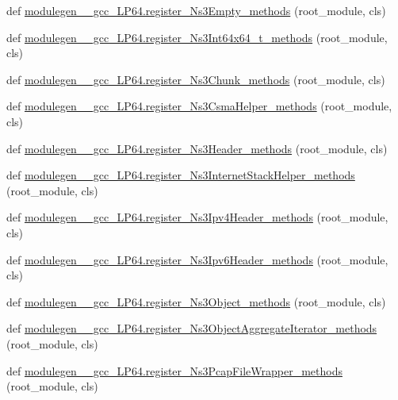 \begin{DoxyCompactItemize}
\item 
def \hyperlink{namespacemodulegen____gcc__LP64_af245edb84966d4b4c48221a31647be89}{modulegen\+\_\+\+\_\+gcc\+\_\+\+L\+P64.\+register\+\_\+\+Ns3\+Empty\+\_\+methods} (root\+\_\+module, cls)
\item 
def \hyperlink{namespacemodulegen____gcc__LP64_a1239c8a15c3a5d5ac5184bd53add8029}{modulegen\+\_\+\+\_\+gcc\+\_\+\+L\+P64.\+register\+\_\+\+Ns3\+Int64x64\+\_\+t\+\_\+methods} (root\+\_\+module, cls)
\item 
def \hyperlink{namespacemodulegen____gcc__LP64_ad963bb0d3bc0910b7d8b5a1818803799}{modulegen\+\_\+\+\_\+gcc\+\_\+\+L\+P64.\+register\+\_\+\+Ns3\+Chunk\+\_\+methods} (root\+\_\+module, cls)
\item 
def \hyperlink{namespacemodulegen____gcc__LP64_a19ffdfe21514224bdd280b30faa77b3b}{modulegen\+\_\+\+\_\+gcc\+\_\+\+L\+P64.\+register\+\_\+\+Ns3\+Csma\+Helper\+\_\+methods} (root\+\_\+module, cls)
\item 
def \hyperlink{namespacemodulegen____gcc__LP64_a3c6ef29ba074be124c68037155fe7cbe}{modulegen\+\_\+\+\_\+gcc\+\_\+\+L\+P64.\+register\+\_\+\+Ns3\+Header\+\_\+methods} (root\+\_\+module, cls)
\item 
def \hyperlink{namespacemodulegen____gcc__LP64_a2bbe9118a5e472d100b17a9727141250}{modulegen\+\_\+\+\_\+gcc\+\_\+\+L\+P64.\+register\+\_\+\+Ns3\+Internet\+Stack\+Helper\+\_\+methods} (root\+\_\+module, cls)
\item 
def \hyperlink{namespacemodulegen____gcc__LP64_a7c04166bfa5c9e31af5742b29aae267d}{modulegen\+\_\+\+\_\+gcc\+\_\+\+L\+P64.\+register\+\_\+\+Ns3\+Ipv4\+Header\+\_\+methods} (root\+\_\+module, cls)
\item 
def \hyperlink{namespacemodulegen____gcc__LP64_a3bf4c1735120b6da054ad14ebaa7c850}{modulegen\+\_\+\+\_\+gcc\+\_\+\+L\+P64.\+register\+\_\+\+Ns3\+Ipv6\+Header\+\_\+methods} (root\+\_\+module, cls)
\item 
def \hyperlink{namespacemodulegen____gcc__LP64_a37449428b6bb64d5e534ebe801291a86}{modulegen\+\_\+\+\_\+gcc\+\_\+\+L\+P64.\+register\+\_\+\+Ns3\+Object\+\_\+methods} (root\+\_\+module, cls)
\item 
def \hyperlink{namespacemodulegen____gcc__LP64_ab66e5c7d4bfc0a0524b69d37ef0bbb53}{modulegen\+\_\+\+\_\+gcc\+\_\+\+L\+P64.\+register\+\_\+\+Ns3\+Object\+Aggregate\+Iterator\+\_\+methods} (root\+\_\+module, cls)
\item 
def \hyperlink{namespacemodulegen____gcc__LP64_a333d484ddac696518d332cdfb4744ca8}{modulegen\+\_\+\+\_\+gcc\+\_\+\+L\+P64.\+register\+\_\+\+Ns3\+Pcap\+File\+Wrapper\+\_\+methods} (root\+\_\+module, cls)

\end{DoxyCompactItemize}
